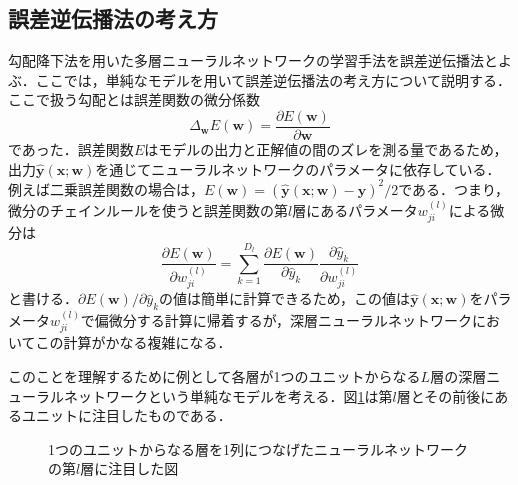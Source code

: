 \documentclass[a4paper,11pt]{jsreport}
\begin{document}
\subsection{誤差逆伝播法の考え方}
勾配降下法を用いた多層ニューラルネットワークの学習手法を誤差逆伝播法とよぶ．ここでは，単純なモデルを用いて誤差逆伝播法の考え方について説明する．ここで扱う勾配とは誤差関数の微分係数
\begin{equation}
  \Delta_{\bm{w}}E(\bm{w}) = \frac{\partial E(\bm{w})}{\partial \bm{w}}
\end{equation}
であった．誤差関数$E$はモデルの出力と正解値の間のズレを測る量であるため，出力$\hat{\bm{y}}(\bm{x};\bm{w})$を通じてニューラルネットワークのパラメータに依存している．例えば二乗誤差関数の場合は，$E(\bm{w}) = (\hat{\bm{y}}(\bm{x};\bm{w}) - \bm{y})^2 / 2$である．つまり，微分のチェインルールを使うと誤差関数の第$l$層にあるパラメータ$w_{ji}^{(l)}$による微分は
\begin{equation}
  \frac{\partial E(\bm{w})}{\partial w_{ji}^{(l)}} 
  = \sum_{k=1}^{D_l} \frac{\partial E(\bm{w})}{\partial \hat{y}_k} \frac{\partial \hat{y}_k}{\partial w_{ji}^{(l)}} 
\end{equation}
と書ける．$\partial E(\bm{w}) / \partial \hat{y}_k$の値は簡単に計算できるため，この値は$\hat{\bm{y}}(\bm{x};\bm{w})$をパラメータ$w_{ji}^{(l)}$で偏微分する計算に帰着するが，深層ニューラルネットワークにおいてこの計算がかなる複雑になる．\par
このことを理解するために例として各層が1つのユニットからなる$L$層の深層ニューラルネットワークという単純なモデルを考える．図\ref{チェインニューラルネットワーク}は第$l$層とその前後にあるユニットに注目したものである．
\begin{figure}[H]
  \begin{center}
    \caption{1つのユニットからなる層を1列につなげたニューラルネットワークの第$l$層に注目した図}
    \label{チェインニューラルネットワーク}
  \end{center}
\end{figure}
\end{document}
